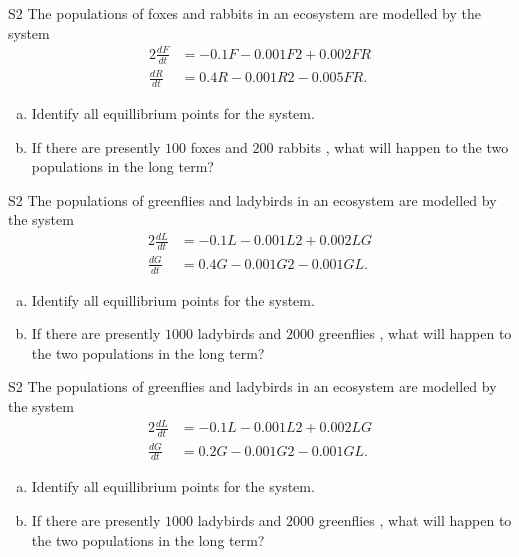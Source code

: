 \begin{problem}{S2}
The populations of foxes and rabbits in an ecosystem are modelled by the system
\begin{alignat*}{2}
\frac{dF}{dt} &= -0.1F − 0.001F 2 + 0.002FR \\
\frac{dR}{dt} & = 0.4R − 0.001R 2 − 0.005FR.
\end{alignat*}
\begin{enumerate}[(a)]
\item Identify all equillibrium points for the system.
\item If there are presently \(100\) foxes and \(200\) rabbits , what will happen to the two populations in the long term?
\end{enumerate}
\end{problem}

\begin{problem}{S2}
The populations of greenflies and ladybirds in an ecosystem are modelled by the system
\begin{alignat*}{2}
\frac{dL}{dt} &= -0.1L − 0.001L 2 + 0.002LG \\
\frac{dG}{dt} & = 0.4G − 0.001G 2 − 0.001GL.
\end{alignat*}
\begin{enumerate}[(a)]
\item Identify all equillibrium points for the system.
\item If there are presently \(1000\) ladybirds and \(2000\) greenflies , what will happen to the two populations in the long term?
\end{enumerate}
\end{problem}

\begin{problem}{S2}
The populations of greenflies and ladybirds in an ecosystem are modelled by the system
\begin{alignat*}{2}
\frac{dL}{dt} &= -0.1L − 0.001L 2 + 0.002LG \\
\frac{dG}{dt} & = 0.2G − 0.001G 2 − 0.001GL.
\end{alignat*}
\begin{enumerate}[(a)]
\item Identify all equillibrium points for the system.
\item If there are presently \(1000\) ladybirds and \(2000\) greenflies , what will happen to the two populations in the long term?
\end{enumerate}
\end{problem}
